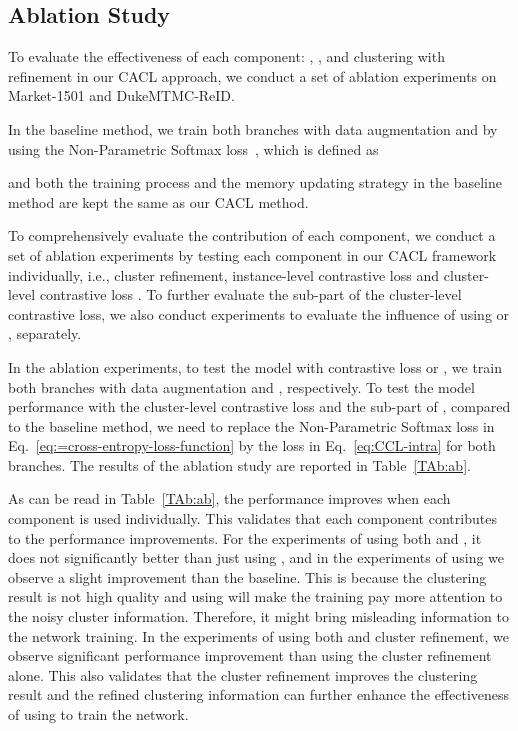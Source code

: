 \documentclass[journal]{IEEEtran}
\def\ie{i.e.}
\begin{document}
\subsection{Ablation Study}


To evaluate the effectiveness of each component: , ,  and clustering with refinement in our CACL approach, we conduct a set of ablation experiments on Market-1501 and DukeMTMC-ReID.

In the baseline method, we train both branches with data augmentation  and   by using the Non-Parametric Softmax loss~\cite{Wu1:CVPR18}, which is defined as 

and both the training process and the memory updating strategy in the baseline method are kept the same as our CACL method.  


To comprehensively evaluate the contribution of each component, we conduct a set of ablation experiments by testing each component in our CACL framework individually, \ie, cluster refinement,  instance-level contrastive loss  and cluster-level contrastive loss . To further evaluate the sub-part of the cluster-level contrastive loss, we also conduct experiments to evaluate the influence of using  or , separately.



In the ablation experiments, to test the model with contrastive loss  or , we train both branches with data augmentation  and , respectively. To test the model performance with the cluster-level contrastive loss  and the sub-part of , compared to the baseline method,  we need to replace the Non-Parametric Softmax loss in Eq.~\eqref{eq:=cross-entropy-loss-function} by the   loss in Eq.~\eqref{eq:CCL-intra} for both branches. The results of the ablation study are reported in Table~\ref{TAb:ab}.  


As can be read in Table~\ref{TAb:ab}, the performance improves when each component is used individually. This validates that each component contributes to the performance improvements. For the experiments of using both   and , it does not significantly better than just using , and in the experiments of using  we observe a slight improvement than the baseline. This is because the clustering result is not high quality and using  will make the training pay more attention to the noisy cluster information. Therefore, it might bring misleading information to the network training. In the experiments of using both  and cluster refinement, we observe significant performance improvement than using the cluster refinement alone. This also validates that the cluster refinement improves the clustering result and the refined clustering information can further enhance the effectiveness of using  to train the network. 
\end{document}
